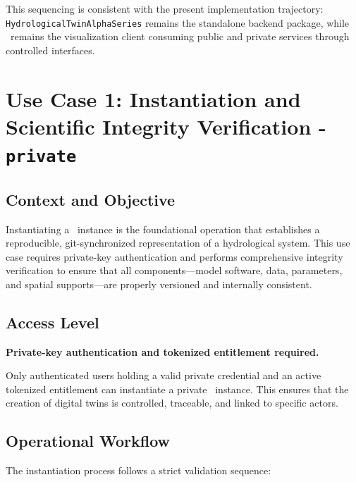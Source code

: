 This sequencing is consistent with the present implementation trajectory: \texttt{HydrologicalTwinAlphaSeries} remains the standalone backend package, while \cwv\ remains the visualization client consuming public and private services through controlled interfaces.


\section{Use Case 1: Instantiation and Scientific Integrity Verification - \texttt{private}}

\subsection{Context and Objective}

Instantiating a \hydrot\ instance is the foundational operation that establishes a reproducible, git-synchronized representation of a hydrological system. This use case requires private-key authentication and performs comprehensive integrity verification to ensure that all components---model software, data, parameters, and spatial supports---are properly versioned and internally consistent.

\subsection{Access Level}

\textbf{Private-key authentication and tokenized entitlement required.}

Only authenticated users holding a valid private credential and an active tokenized entitlement can instantiate a private \hydrot\ instance. This ensures that the creation of digital twins is controlled, traceable, and linked to specific actors.

\subsection{Operational Workflow}

The instantiation process follows a strict validation sequence:

